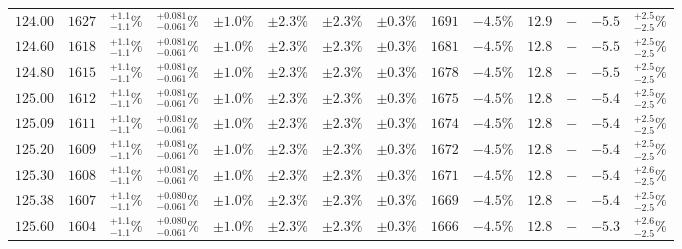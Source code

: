 \begin{landscape}
\begin{table}[ht!]
{\begin{tabular}{| cc | ccc | ccc | ccc | cc | c |}
$124.00$ & $1627$ & $^{+1.1}_{-1.1}\%$ & {\color{black!55}$^{+0.081}_{-0.061}\%$} & {\color{black!55}$\pm 1.0\%$} & $\pm 2.3\%$ & {\color{black!55}$\pm 2.3\%$} & {\color{black!55}$\pm 0.3\%$} & $1691$ & $-4.5\%$ & $12.9$ & $-$ & $-5.5$ & $^{+2.5}_{-2.5}\%$ \\
$124.60$ & $1618$ & $^{+1.1}_{-1.1}\%$ & {\color{black!55}$^{+0.081}_{-0.061}\%$} & {\color{black!55}$\pm 1.0\%$} & $\pm 2.3\%$ & {\color{black!55}$\pm 2.3\%$} & {\color{black!55}$\pm 0.3\%$} & $1681$ & $-4.5\%$ & $12.8$ & $-$ & $-5.5$ & $^{+2.5}_{-2.5}\%$ \\
$124.80$ & $1615$ & $^{+1.1}_{-1.1}\%$ & {\color{black!55}$^{+0.081}_{-0.061}\%$} & {\color{black!55}$\pm 1.0\%$} & $\pm 2.3\%$ & {\color{black!55}$\pm 2.3\%$} & {\color{black!55}$\pm 0.3\%$} & $1678$ & $-4.5\%$ & $12.8$ & $-$ & $-5.5$ & $^{+2.5}_{-2.5}\%$ \\
$125.00$ & $1612$ & $^{+1.1}_{-1.1}\%$ & {\color{black!55}$^{+0.081}_{-0.061}\%$} & {\color{black!55}$\pm 1.0\%$} & $\pm 2.3\%$ & {\color{black!55}$\pm 2.3\%$} & {\color{black!55}$\pm 0.3\%$} & $1675$ & $-4.5\%$ & $12.8$ & $-$ & $-5.4$ & $^{+2.5}_{-2.5}\%$ \\
$125.09$ & $1611$ & $^{+1.1}_{-1.1}\%$ & {\color{black!55}$^{+0.081}_{-0.061}\%$} & {\color{black!55}$\pm 1.0\%$} & $\pm 2.3\%$ & {\color{black!55}$\pm 2.3\%$} & {\color{black!55}$\pm 0.3\%$} & $1674$ & $-4.5\%$ & $12.8$ & $-$ & $-5.4$ & $^{+2.5}_{-2.5}\%$ \\
$125.20$ & $1609$ & $^{+1.1}_{-1.1}\%$ & {\color{black!55}$^{+0.081}_{-0.061}\%$} & {\color{black!55}$\pm 1.0\%$} & $\pm 2.3\%$ & {\color{black!55}$\pm 2.3\%$} & {\color{black!55}$\pm 0.3\%$} & $1672$ & $-4.5\%$ & $12.8$ & $-$ & $-5.4$ & $^{+2.5}_{-2.5}\%$ \\
$125.30$ & $1608$ & $^{+1.1}_{-1.1}\%$ & {\color{black!55}$^{+0.081}_{-0.061}\%$} & {\color{black!55}$\pm 1.0\%$} & $\pm 2.3\%$ & {\color{black!55}$\pm 2.3\%$} & {\color{black!55}$\pm 0.3\%$} & $1671$ & $-4.5\%$ & $12.8$ & $-$ & $-5.4$ & $^{+2.6}_{-2.5}\%$ \\
$125.38$ & $1607$ & $^{+1.1}_{-1.1}\%$ & {\color{black!55}$^{+0.080}_{-0.061}\%$} & {\color{black!55}$\pm 1.0\%$} & $\pm 2.3\%$ & {\color{black!55}$\pm 2.3\%$} & {\color{black!55}$\pm 0.3\%$} & $1669$ & $-4.5\%$ & $12.8$ & $-$ & $-5.4$ & $^{+2.5}_{-2.5}\%$ \\
$125.60$ & $1604$ & $^{+1.1}_{-1.1}\%$ & {\color{black!55}$^{+0.080}_{-0.061}\%$} & {\color{black!55}$\pm 1.0\%$} & $\pm 2.3\%$ & {\color{black!55}$\pm 2.3\%$} & {\color{black!55}$\pm 0.3\%$} & $1666$ & $-4.5\%$ & $12.8$ & $-$ & $-5.3$ & $^{+2.6}_{-2.5}\%$ \\

\end{tabular}}
\end{table}
\end{landscape}
